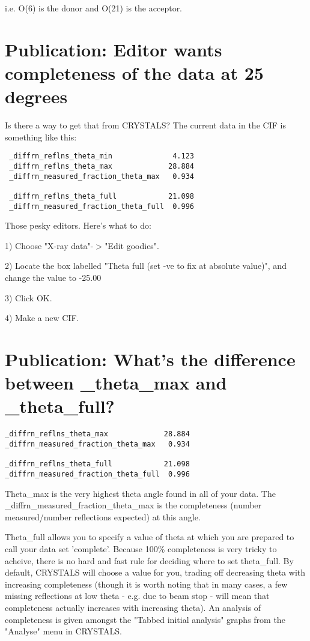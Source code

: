 \documentclass[10pt,a4paper]{report}
\begin{document}
i.e. O(6) is the donor and O(21) is the acceptor.



\section{Publication: Editor wants completeness of the data at 25 degrees}


Is there a way to get that from CRYSTALS?
The current data in the CIF is something like this:
\small\begin{verbatim} 
 _diffrn_reflns_theta_min              4.123
 _diffrn_reflns_theta_max             28.884 
 _diffrn_measured_fraction_theta_max   0.934 
  
 _diffrn_reflns_theta_full            21.098
 _diffrn_measured_fraction_theta_full  0.996
\end{verbatim}\normalsize

 


Those pesky editors. Here's what to do:



1)  Choose "X-ray data"-$>$"Edit goodies".



2)  Locate the box labelled "Theta full (set -ve to fix at absolute
    value)", and change the value to -25.00



3)  Click OK.



4)  Make a new CIF.



\section{Publication: What's the difference between \_theta\_max and \_theta\_full?}
\small\begin{verbatim}
_diffrn_reflns_theta_max             28.884 
_diffrn_measured_fraction_theta_max   0.934 
 
_diffrn_reflns_theta_full            21.098
_diffrn_measured_fraction_theta_full  0.996
\end{verbatim}\normalsize

 


Theta\_max is the very highest theta angle found in all of your
data. The \_diffrn\_measured\_fraction\_theta\_max is the completeness
(number measured/number reflections expected) at this angle.




Theta\_full allows you to specify a value of theta at which you
are prepared to call your data set 'complete'. Because 100\% completeness
is very tricky to acheive, there is no hard and fast rule for
deciding where to set theta\_full. By default, CRYSTALS will choose
a value for you, trading off decreasing theta with increasing completeness 
(though it is worth noting that in many cases, a few missing reflections
at low theta - e.g. due to beam stop - will mean that completeness actually
increases with increasing theta).  An analysis of completeness is
given amongst the "Tabbed initial analysis" graphs from the "Analyse" menu
in CRYSTALS.
\end{document}
